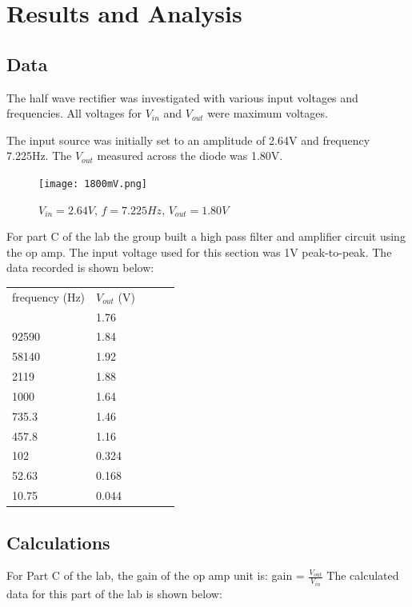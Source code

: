 \documentclass[twocolumn, amsmath]{revtex4}
\begin{document}
\section{Results and Analysis}

\subsection{Data}
The half wave rectifier was investigated with various input voltages and frequencies. All voltages for $V_{in}$ and $V_{out}$ were maximum voltages.

The input source was initially set to an amplitude of 2.64V and frequency 7.225Hz. The $V_{out}$ measured across the diode was 1.80V.

\begin{figure}[h]
    \texttt{[image: 1800mV.png]}  
    \caption{$V_{in}= 2.64V$, $f=7.225Hz$, $V_{out} = 1.80V$}
\end{figure}



For part C of the lab the group built a high pass filter and amplifier circuit using the op amp. The input voltage used for this section was 1V peak-to-peak. The data recorded is shown below:

\begin{center}
	\begin{ruledtabular}
    \begin{tabular}{ l l l l l }
	frequency (Hz) & $V_{out}$ (V) \\ \colrule
	102000 & 1.76 \\
	92590 & 1.84  \\
	58140 & 1.92 \\
	2119 & 1.88 \\
	1000 & 1.64 \\
	735.3 & 1.46 \\
	457.8 & 1.16 \\
	102 & 0.324 \\
	52.63 & 0.168 \\
	10.75 & 0.044 \\
\end{tabular}
    \end{ruledtabular}
\end{center}


\subsection{Calculations}


For Part C of the lab, the gain of the op amp unit is: gain = $\frac{V_{out}}{V_{in}}$ The calculated data for this part of the lab is shown below:
\end{document}
